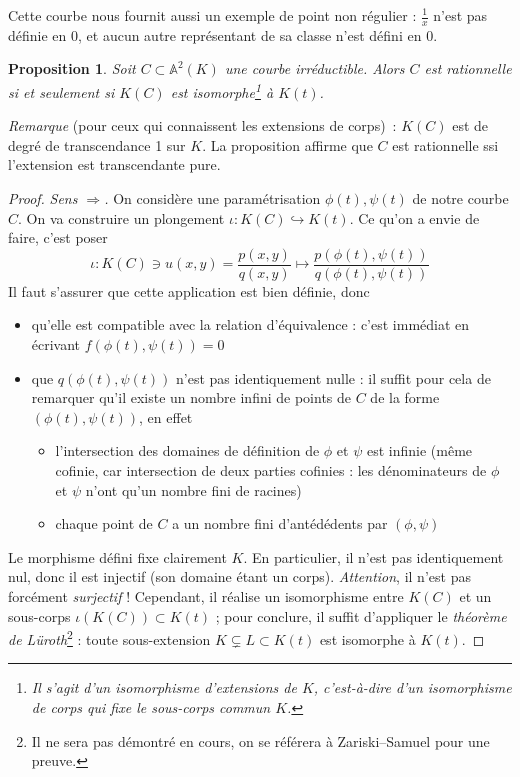 \documentclass[a4paper, 11pt]{article}
\newtheorem{proposition}[théorème]{Proposition}
\theoremstyle{definition}
\newcommand{\aff}{\mathbb{A}}
\begin{document}
Cette courbe nous fournit aussi un exemple de point non régulier :
$\frac{1}{x}$ n'est pas définie en $0$, et aucun autre représentant de
sa classe n'est défini en $0$.

\begin{proposition}
  Soit $C \subset \aff^2(K)$ une courbe irréductible. Alors $C$ est
  rationnelle si et seulement si $K(C)$ est isomorphe\footnote{Il
    s'agit d'un isomorphisme d'extensions de $K$, c'est-à-dire d'un
    isomorphisme de corps qui fixe le sous-corps commun $K$.} à
  $K(t)$.
\end{proposition}
\textit{Remarque} (pour ceux qui connaissent les extensions de
corps)~: $K(C)$ est de degré de transcendance 1 sur $K$. La
proposition affirme que $C$ est rationnelle ssi l'extension est
transcendante pure.

\begin{proof}
  \textit{Sens $\Rightarrow$.} On considère une paramétrisation
  $\phi(t), \psi(t)$ de notre courbe $C$. On va construire un
  plongement $\iota : K(C) \hookrightarrow K(t)$. Ce qu'on a envie de
  faire, c'est poser
  \[ \iota : K(C) \ni u(x,y) = \frac{p(x,y)}{q(x,y)} \mapsto
  \frac{p(\phi(t),\psi(t))}{q(\phi(t),\psi(t))} \]
  Il faut s'assurer que cette application est bien définie, donc
  \begin{itemize}
  \item qu'elle est compatible avec la relation d'équivalence : c'est
    immédiat en écrivant $f(\phi(t),\psi(t)) = 0$
  \item que $q(\phi(t),\psi(t))$ n'est pas identiquement nulle : il
    suffit pour cela de remarquer qu'il existe un nombre infini de
    points de $C$ de la forme $(\phi(t),\psi(t))$, en effet
    \begin{itemize}
    \item l'intersection des domaines de définition de $\phi$ et
      $\psi$ est infinie (même cofinie, car intersection de deux
      parties cofinies : les dénominateurs de $\phi$ et $\psi$ n'ont
      qu'un nombre fini de racines)
    \item chaque point de $C$ a un nombre fini d'antédédents par
      $(\phi, \psi)$
    \end{itemize}
  \end{itemize}
  Le morphisme défini fixe clairement $K$. En particulier, il n'est
  pas identiquement nul, donc il est injectif (son domaine étant un
  corps). \emph{Attention}, il n'est pas forcément \emph{surjectif} !
  Cependant, il réalise un isomorphisme entre $K(C)$ et un sous-corps
  $\iota(K(C)) \subset K(t)$ ; pour conclure, il suffit d'appliquer le
  \emph{théorème de Lüroth}\footnote{Il ne sera pas démontré en cours,
    on se référera à Zariski--Samuel pour une preuve.} : toute
  sous-extension $K \subsetneq L \subset K(t)$ est isomorphe à $K(t)$.


\end{proof}
\end{document}
